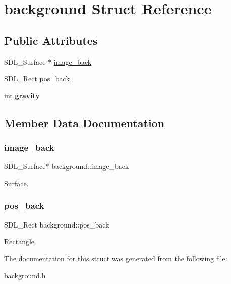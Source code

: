 \hypertarget{structbackground}{}\section{background Struct Reference}
\label{structbackground}
\subsection*{Public Attributes}
\begin{DoxyCompactItemize}
\item 
S\+D\+L\+\_\+\+Surface $\ast$ \hyperlink{structbackground_affdbb78ee8318f843c078291216b516a}{image\+\_\+back}
\item 
S\+D\+L\+\_\+\+Rect \hyperlink{structbackground_a32e36d3e27e3369de719761d14c374fe}{pos\+\_\+back}
\item 
\mbox{\label{structbackground_a0d72cdea0f26aca19e8fb1b648a2c8b5}} 
int {\bfseries gravity}
\end{DoxyCompactItemize}


\subsection{Member Data Documentation}
\mbox{\label{structbackground_affdbb78ee8318f843c078291216b516a}} 
\subsubsection{\texorpdfstring{image\+\_\+back}{image\_back}}
{\footnotesize\ttfamily S\+D\+L\+\_\+\+Surface$\ast$ background\+::image\+\_\+back}

Surface. \mbox{\label{structbackground_a32e36d3e27e3369de719761d14c374fe}} 
\subsubsection{\texorpdfstring{pos\+\_\+back}{pos\_back}}
{\footnotesize\ttfamily S\+D\+L\+\_\+\+Rect background\+::pos\+\_\+back}

Rectangle 

The documentation for this struct was generated from the following file\+:\begin{DoxyCompactItemize}
\item 
background.\+h\end{DoxyCompactItemize}
